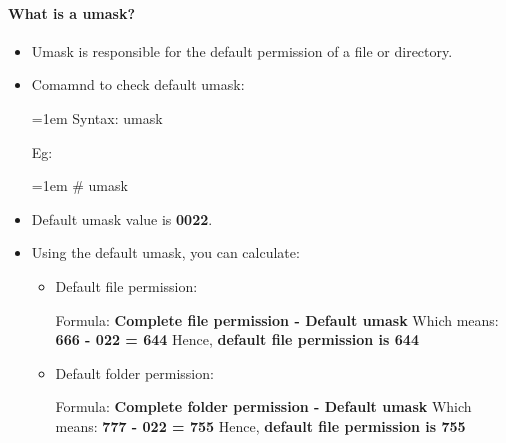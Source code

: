 \setlength{\columnsep}{3pt}
\begin{flushleft}
	\bigskip
	
	\paragraph{What is a umask?}
	\begin{itemize}
		\item Umask is responsible for the default permission of a file or directory.
		\item Comamnd to check default umask:
		\begin{tcolorbox}[breakable,notitle,boxrule=1pt,colback=pink,colframe=pink]
			\color{black}
			\font=1em
			Syntax:  umask
			\font=4pt
		\end{tcolorbox}
		Eg:
		\bigskip
		\begin{tcolorbox}[breakable,notitle,boxrule=1pt,colback=black,colframe=black]
			\color{green}
			\font=1em
			\# umask
			\color{white}
			\font=4pt
		\end{tcolorbox}
		\item Default umask value is \textbf{0022}.
		\item Using the default umask, you can calculate:
		\begin{itemize}
			\item Default file permission:
			\bigskip
				\begin{tcolorbox}[breakable,notitle,boxrule=1pt,colback=pink,colframe=pink]
					\color{black}
					Formula:  \textbf{Complete file permission - Default umask}
					\newline
					Which means: \textbf{666 - 022 = 644}
					\newline
					Hence, \textbf{default file permission is 644}
				\end{tcolorbox}
			\bigskip
			\bigskip
			\item Default folder permission:
			\bigskip
					\begin{tcolorbox}[breakable,notitle,boxrule=1pt,colback=pink,colframe=pink]
					\color{black}
					Formula:  \textbf{Complete folder permission - Default umask}
					\newline
					Which means: \textbf{777 - 022 = 755}
					\newline
					Hence, \textbf{default file permission is 755}
				\end{tcolorbox}
		\end{itemize}
	\end{itemize}


\end{flushleft}
